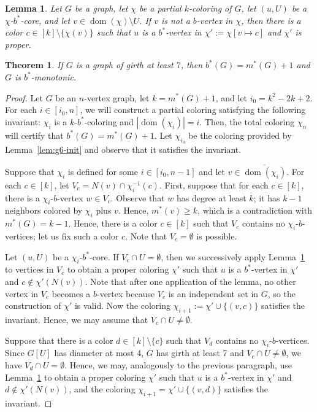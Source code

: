 \documentclass[10pt,a4paper]{amsart}
\newtheorem{lemma}{Lemma}
\newtheorem{theorem}{Theorem}
\DeclareMathOperator{\dom}{dom}
\begin{document}
\begin{lemma}\label{lem:recolor}
Let $G$ be a graph, let $\chi$ be a partial $k$-coloring of $G$, let $(u, U)$ be a $\chi$-$b^*$-core, and let $v \in \dom(\chi) \setminus U$.
If $v$ is not a $b$-vertex in $\chi$, 
then there is a color $c \in [k] \setminus \{\chi(v)\}$ such that $u$ is a $b^*$-vertex in $\chi' := \chi[v \mapsto c]$ and $\chi'$ is proper.
\end{lemma}

\begin{theorem}\label{thm:girth7}
If $G$ is a graph of girth at least $7$, then $b^*(G) = m^*(G) + 1$ and $G$ is $b^*$-monotonic.
\end{theorem}

\begin{proof}
Let $G$ be an $n$-vertex graph, let $k = m^*(G) + 1$, and let $i_0 = k^2 - 2k + 2$.
For each $i \in [i_0, n]$, we will construct a partial coloring satisfying the following invariant: $\chi_i$ is a $k$-$b^*$-coloring and $|\dom(\chi_i)| = i$. 
Then, the total coloring $\chi_n$ will certify that $b^*(G) = m^*(G) + 1$.
Let $\chi_{i_0}$ be the coloring provided by Lemma~\ref{lem:g6-init} and observe that it satisfies the invariant.

Suppose that $\chi_i$ is defined for some $i \in [i_0, n-1]$ and let $v \in \overline{\dom(\chi_i)}$.
For each $c \in [k]$, let $V_c = N(v) \cap \chi_i^{-1}(c)$.
First, suppose that for each $c \in [k]$, there is a $\chi_i$-$b$-vertex $w \in V_c$.
Observe that $w$ has degree at least $k$; it has $k-1$ neighbors colored by $\chi_i$ plus $v$.
Hence, $m^*(v) \ge k$, which is a contradiction with $m^*(G) = k-1$.
Hence, there is a color $c \in [k]$ such that $V_c$ contains no $\chi_i$-$b$-vertices; let us fix such a color $c$. Note that $V_c = \emptyset$ is possible.

Let $(u, U)$ be a $\chi_i$-$b^*$-core.
If $V_c \cap U = \emptyset$, then we successively apply Lemma~\ref{lem:recolor} to vertices in $V_c$ to obtain a proper coloring $\chi'$ such that $u$ is a $b^*$-vertex in $\chi'$ and $c \notin \chi'(N(v))$.
Note that after one application of the lemma, no other vertex in $V_c$ becomes a $b$-vertex because $V_c$ is an independent set in $G$, so the construction of $\chi'$ is valid.
Now the coloring $\chi_{i+1} := \chi' \cup \{(v, c)\}$ satisfies the invariant.
Hence, we may assume that $V_c \cap U \ne \emptyset$.

Suppose that there is a color $d \in [k] \setminus \{c\}$ such that $V_d$ contains no $\chi_i$-$b$-vertices.
Since $G[U]$ has diameter at most 4, $G$ has girth at least 7 and $V_c \cap U \ne \emptyset$, we have $V_d \cap U = \emptyset$.
Hence, we may, analogously to the previous paragraph, use Lemma~\ref{lem:recolor} to obtain a proper coloring $\chi'$ such that $u$ is a $b^*$-vertex in $\chi'$ and $d \notin \chi'(N(v))$, and the coloring $\chi_{i+1} = \chi' \cup \{(v, d)\}$ satisfies the invariant.


\end{proof}
\end{document}
